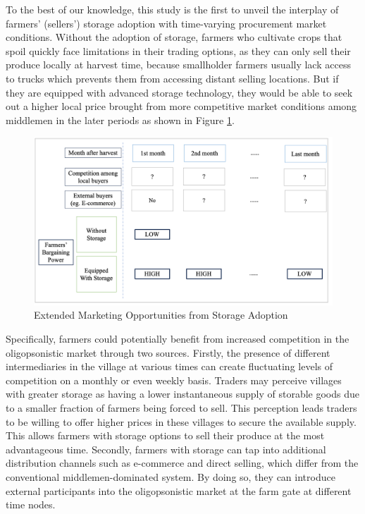 To the best of our knowledge, this study is the first to unveil the interplay of farmers' (sellers') storage adoption with time-varying procurement market conditions. Without the adoption of storage, farmers who cultivate crops that spoil quickly face limitations in their trading options, as they can only sell their produce locally at harvest time, because smallholder farmers usually lack access to trucks which prevents them from accessing distant selling locations. But if they are equipped with advanced storage technology, they would be able to seek out a higher local price brought from more competitive market conditions among middlemen in the later periods as shown in Figure \ref{Figure: Demo}.

\begin{figure}[ht]
\centering
\includegraphics[width=1\textwidth]{figures/graphic_demo.png}
\caption{Extended Marketing Opportunities from Storage Adoption}
\label{Figure: Demo}
\end{figure}

Specifically, farmers could potentially benefit from increased competition in the oligopsonistic market through two sources. Firstly, the presence of different intermediaries in the village at various times can create fluctuating levels of competition on a monthly or even weekly basis. Traders may perceive villages with greater storage as having a lower instantaneous supply of storable goods due to a smaller fraction of farmers being forced to sell. This perception leads traders to be willing to offer higher prices in these villages to secure the available supply. This allows farmers with storage options to sell their produce at the most advantageous time. Secondly, farmers with storage can tap into additional distribution channels such as e-commerce and direct selling, which differ from the conventional middlemen-dominated system. By doing so, they can introduce external participants into the oligopsonistic market at the farm gate at different time nodes. 

